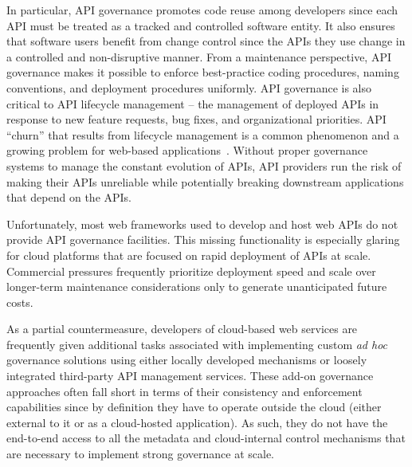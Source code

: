 In particular, API governance promotes code reuse among developers
since each API must be treated as a tracked and controlled software entity.
It also ensures that software users benefit from change control since the APIs
they use
change in a controlled and non-disruptive manner.  From a maintenance
perspective, API governance 
makes it possible to enforce best-practice coding procedures, 
naming conventions, and deployment procedures uniformly.
API governance is also critical to API lifecycle
management --  the management of deployed APIs in response to new feature
requests, bug fixes, and organizational priorities. 
API ``churn'' that results from lifecycle management
is a common phenomenon and a growing
problem for web-based applications~\cite{portingeffort}.
Without proper governance systems to manage the constant evolution of APIs,
API providers run the risk of making their APIs unreliable while potentially
breaking downstream applications that depend on the APIs.

Unfortunately, most web frameworks used to develop and host web APIs do not 
provide API governance facilities. This missing functionality is
especially glaring
for cloud platforms that are focused on rapid
deployment of APIs at scale.   Commercial pressures frequently prioritize
deployment speed and scale over longer-term maintenance considerations only to
generate unanticipated future costs.

As a partial countermeasure, developers of cloud-based web services are 
frequently given
additional tasks associated with 
implementing custom {\em ad hoc} governance solutions using either locally
developed mechanisms or loosely integrated
third-party API management services. 
These add-on governance
approaches often fall short in terms of their consistency and enforcement
capabilities since
by definition they have to operate outside the
cloud (either external to it or as a cloud-hosted application). 
As such, they do not have the end-to-end 
access to all the metadata and cloud-internal control mechanisms
that are necessary to implement strong governance at scale. 

